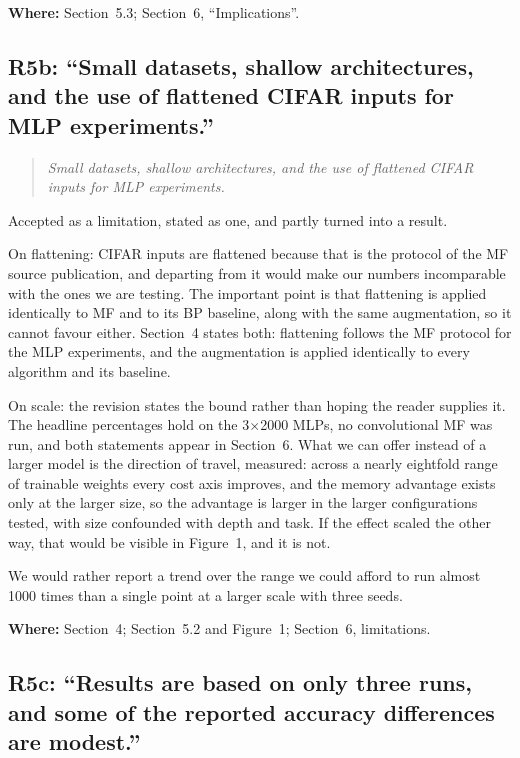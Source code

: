 \documentclass[11pt,a4paper]{article}
\newcommand{\MF}{MF}
\newcommand{\BP}{BP}
\newenvironment{comment}%
  {\begin{quote}\itshape\small}%
  {\end{quote}}
\newcommand{\where}[1]{\par\smallskip\noindent\textbf{Where:} #1\par}
\begin{document}
\where{Section~5.3; Section~6, ``Implications''.}

\subsection*{R5b: ``Small datasets, shallow architectures, and the use of
flattened CIFAR inputs for MLP experiments.''}

\begin{comment}
Small datasets, shallow architectures, and the use of flattened CIFAR inputs
for MLP experiments.
\end{comment}

\noindent
Accepted as a limitation, stated as one, and partly turned into a result.

On flattening: CIFAR inputs are flattened because that is the protocol of the
\MF{} source publication, and departing from it would make our numbers
incomparable with the ones we are testing. The important point is that
flattening is applied identically to \MF{} and to its \BP{} baseline, along
with the same augmentation, so it cannot favour either. Section~4 states
both: flattening follows the \MF{} protocol for the MLP experiments, and the
augmentation is applied identically to every algorithm and its baseline.

On scale: the revision states the bound rather than hoping the reader supplies
it. The headline percentages hold on the \num{3}$\times$\num{2000} MLPs, no
convolutional \MF{} was run, and both statements appear in Section~6. What we can offer instead of a larger model is the
direction of travel, measured: across a nearly eightfold range of trainable
weights every cost axis improves, and the memory advantage exists only at the
larger size, so the advantage is larger in the larger configurations tested,
with size confounded with depth and task. If the effect scaled the other way, that would be visible in
Figure~1, and it is not.

We would rather report a trend over the range we could afford to run
almost \num{1000} times than a single point at a larger scale with three seeds.

\where{Section~4; Section~5.2 and Figure~1; Section~6, limitations.}

\subsection*{R5c: ``Results are based on only three runs, and some of the
reported accuracy differences are modest.''}
\end{document}
